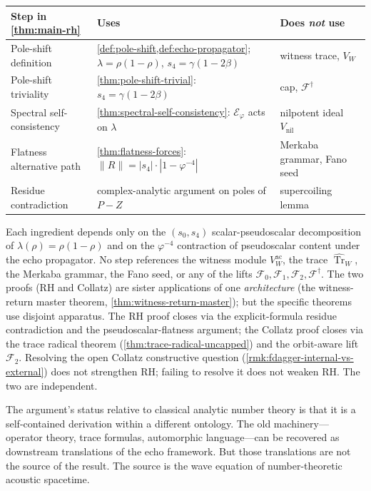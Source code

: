 \documentclass[11pt,a4paper]{article}
\theoremstyle{plain}
\theoremstyle{definition}
\theoremstyle{remark}
\numberwithin{equation}{section}
\newcommand{\vp}{\varphi}
\DeclareMathOperator{\Tr}{Tr}
\providecommand{\nil}{\mathrm{nil}}
\begin{document}
\begin{center}
\small
\begin{tabular}{@{}p{3.3cm}p{7.3cm}p{4.0cm}@{}}
  \toprule
  \textbf{Step in \cref{thm:main-rh}} & \textbf{Uses} & \textbf{Does \emph{not} use}\\
  \midrule
  Pole-shift definition & \cref{def:pole-shift,def:echo-propagator}; $\lambda=\rho(1-\rho)$, $s_4=\gamma(1-2\beta)$ & witness trace, $V_W$ \\
  Pole-shift triviality & \cref{thm:pole-shift-trivial}: $s_4=\gamma(1-2\beta)$ & cap, $\mathcal{F}^{\dagger}$ \\
  Spectral self-consistency & \cref{thm:spectral-self-consistency}: $\mathcal{E}_\vp$ acts on $\lambda$ & nilpotent ideal $V_{\nil}$ \\
  Flatness alternative path & \cref{thm:flatness-forces}: $\|R\|=|s_4|\cdot|1-\vp^{-4}|$ & Merkaba grammar, Fano seed \\
  Residue contradiction & complex-analytic argument on poles of $P-Z$ & supercoiling lemma \\
  \bottomrule
\end{tabular}
\end{center}

\noindent
Each ingredient depends only on the $(s_0,s_4)$ scalar-pseudoscalar
decomposition of $\lambda(\rho)=\rho(1-\rho)$ and on the
$\vp^{-4}$ contraction of pseudoscalar content under the echo
propagator.  No step references the witness module
$V_W^{\mathrm{ac}}$, the trace $\widehat{\Tr}_W$, the Merkaba
grammar, the Fano seed, or any of the lifts $\mathcal{F}_0,
\mathcal{F}_1, \mathcal{F}_2, \mathcal{F}^{\dagger}$.  The two
proofs (RH and Collatz) are sister applications of one
\emph{architecture} (the witness-return master theorem,
\cref{thm:witness-return-master}); but the specific theorems use
disjoint apparatus.  The RH proof closes via the explicit-formula
residue contradiction and the pseudoscalar-flatness argument; the
Collatz proof closes via the trace radical theorem
(\cref{thm:trace-radical-uncapped}) and the orbit-aware lift
$\mathcal{F}_2$.  Resolving the open Collatz constructive
question (\cref{rmk:fdagger-internal-vs-external}) does not
strengthen RH; failing to resolve it does not weaken RH.  The
two are independent.

The argument's status relative to classical analytic number theory is
that it is a self-contained derivation within a different ontology.  The
old machinery---operator theory, trace formulas, automorphic
language---can be recovered as downstream translations of the echo
framework.  But those translations are not the source of the result.
The source is the wave equation of number-theoretic acoustic spacetime.
\end{document}
